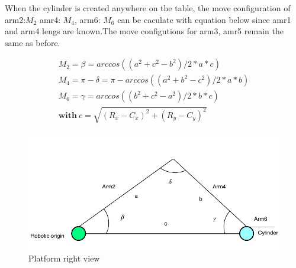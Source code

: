 When the cylinder is created anywhere on the table, the move configuration of arm2:$M_2$ amr4: $M_4$, arm6: $M_6$ can be caculate with equation below since amr1 and arm4 lengs are known.The move configutions for arm3, amr5 remain the same as before. 
 


\begin{equation}
\begin{aligned}
M_2=\beta=arccos((a^2+c^2-b^2)/2*a*c)\\
M_4=\pi-\delta=\pi-arccos((a^2+b^2-c^2)/2*a*b)\\
M_6=\gamma=arccos((b^2+c^2-a^2)/2*b*c)\\
\textbf{with}\ c=\sqrt{(R_x-C_x)^2+(R_y-C_y)^2}
\end{aligned}
\end{equation}

\begin{figure}[tpb]
\centering
	\includegraphics[width=0.96\linewidth]{figures/right_v.pdf} 
	\caption{Platform right view}
	\vspace{-0.4cm}
	\label{fig:right}
\end{figure}



